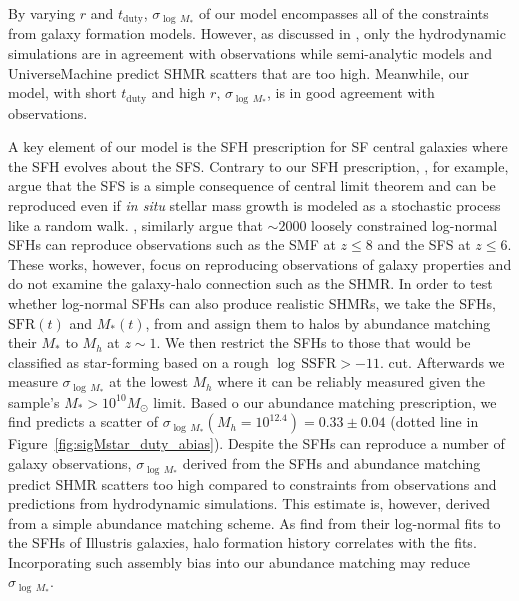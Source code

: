 \documentclass[12pt, letterpaper, preprint, tighten]{aastex62}
\begin{document}
By varying $r$ and $t_\mathrm{duty}$, $\sigma_{\log\,M_*}$ of our model 
encompasses all of the constraints from galaxy formation models. However, as
discussed in \cite{wechsler2018}, only the hydrodynamic simulations are in 
agreement with observations while semi-analytic models and {\sc UniverseMachine}
predict SHMR scatters that are too high. Meanwhile, our model, with short 
$t_\mathrm{duty}$ and high $r$, $\sigma_{\log\,M_*}$, is in good agreement with 
observations. 



A key element of our model is the SFH prescription for SF central galaxies where 
the SFH evolves about the SFS. Contrary to our SFH prescription, \cite{kelson2014}, 
for example, argue that the SFS is a simple consequence of central limit theorem 
and can be reproduced even if \emph{in situ} stellar mass growth is modeled as 
a stochastic process like a random walk. \cite{gladders2013,abramson2015,abramson2016}, 
similarly argue that $\sim2000$ loosely constrained log-normal SFHs can reproduce 
observations such as the SMF at $z \leq 8$ and the SFS at $z \leq 6$. These works, 
however, focus on reproducing observations of galaxy properties and do not examine
the galaxy-halo connection such as the SHMR. In order to test whether log-normal 
SFHs can also produce realistic SHMRs, we take the SFHs, $\mathrm{SFR}(t)$ and 
$M_*(t)$, from \cite{abramson2016} and assign them to halos by abundance matching 
their $M_*$ to $M_h$ at $z{\sim}1$. We then restrict the SFHs to those that would 
be classified as star-forming based on a rough $\log\,\mathrm{SSFR} > -11.$ cut.
Afterwards we measure $\sigma_{\log\,M_*}$ at the lowest $M_h$ where it can be 
reliably measured given the \cite{abramson2016} sample's $M_*{>}10^{10}M_\odot$ 
limit. Based o our abundance matching prescription, we find \cite{abramson2016}
predicts a scatter of $\sigma_{\log\,M_*}(M_h=10^{12.4}) = 0.33\pm0.04$ (dotted 
line in Figure~\ref{fig:sigMstar_duty_abias}). Despite the \cite{abramson2016} SFHs 
can reproduce a number of galaxy observations, $\sigma_{\log\,M_*}$ derived from 
the SFHs and abundance matching predict SHMR scatters too high compared to 
constraints from observations and predictions from hydrodynamic simulations. 
This estimate is, however, derived from a simple abundance matching scheme. 
As \cite{diemer2017} find from their log-normal fits to the SFHs of Illustris 
galaxies, halo formation history correlates with the fits. Incorporating such 
assembly bias into our abundance matching may reduce $\sigma_{\log\,M_*}$.
\end{document}

